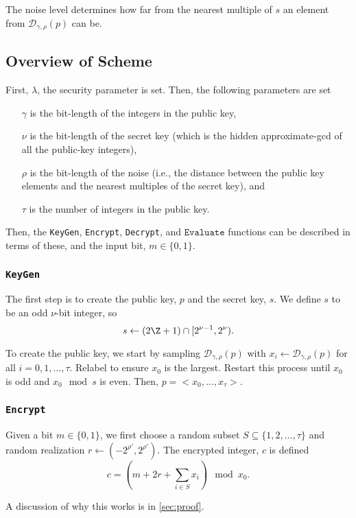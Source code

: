 \documentclass[a4paper,11pt, oneside]{article}
\renewcommand{\D}{\mathcal{D}_{\gamma,\rho}(p)}
\begin{document}
The noise level determines how far from the nearest multiple of $s$ an element from $\D$ can be.

    \subsection{Overview of Scheme}\label{scheme}
    First, $\lambda$, the security parameter is set.  Then, the following parameters are set
\begin{itemize}
    \item[$\gamma$] is the bit-length of the integers in the public key, 
    \item[$\nu$] is the bit-length of the secret key (which is the hidden approximate-gcd of all the public-key integers), 
    \item[$\rho$] is the bit-length of the noise (i.e., the distance between the public key elements and the nearest multiples of the secret key), and 
    \item[$\tau$] is the number of integers in the public key.
\end{itemize}

Then, the \texttt{KeyGen}, \texttt{Encrypt}, \texttt{Decrypt}, and $\texttt{Evaluate}$ functions can be described in terms of these, and the input bit, $m\in\{0,1\}$.

\subsubsection{\texttt{KeyGen}}
The first step is to create the public key, $p$ and the secret key, $s$.  We define $s$ to be an odd $\nu$-bit integer, so
\[ s\leftarrow (2\Z + 1)\cap [2^{\nu - 1}, 2^\nu).\]


To create the public key, we start by sampling $\D$ with $x_i \leftarrow \D$ for all $i=0,1,\dots,\tau$.  Relabel to ensure $x_0$ is the largest.  Restart this process until $x_0$ is odd and $x_0\mod{s}$ is even.  Then, $p = <x_0,\dots,x_\tau>$.
    
\subsubsection{\texttt{Encrypt}}

Given a bit $m\in\{0,1\}$, we first choose a random subset $S\subseteq \{1,2,\dots,\tau\}$ and random realization $r\leftarrow (-2^{\rho'},2^{\rho'})$.  The encrypted integer, $c$ is defined
\[c = \left( m+2r + \sum_{i\in S}x_i \right)\mod{x_0}.\]

A discussion of why this works is in \ref{sec:proof}.
\end{document}
